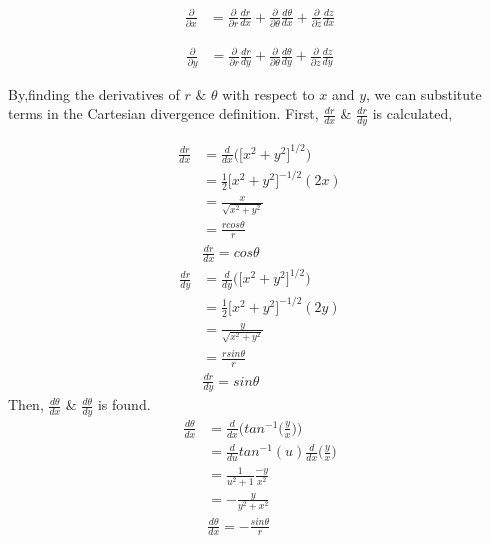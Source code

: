 \documentclass[12pt]{article}
\begin{document}
\begin{align*}
	\frac{\partial }{\partial x}
	&= \frac{\partial }{\partial r}\frac{d r}{d x} +
	\frac{\partial }{\partial \theta}\frac{d \theta}{d x} +
	\frac{\partial }{\partial z}\frac{d z}{d x} 
\end{align*}

\begin{align*}
	\frac{\partial }{\partial y}
	&=
	\frac{\partial }{\partial r} 	 \frac{d r}{d y} +
	\frac{\partial }{\partial \theta} \frac{d \theta}{d y} + \frac{\partial }{\partial z}     \frac{d z}{d y}
\end{align*}


By,finding the derivatives of $r$ $\&$ $\theta$ with respect to $x$ and $y$, we can substitute terms in the Cartesian divergence definition. First, $\frac{dr}{dx}$ \& $\frac{dr}{dy}$ is calculated,

\begin{align*}
 	\frac{dr}{dx}                                      
	&= \frac{d}{dx} \Bigg(\Big[ x^2 + y^2 \Big]^{1/2}\Bigg) \\
	&= \frac{1}{2} \Big[ x^2 + y^2 \Big]^{-1/2} (2x) \\
 	&=	\frac{x}{\sqrt{x^2+y^2}}\\
 	&= \frac{r cos\theta}{r}\\
 	& \boxed{\frac{dr}{dx} = cos\theta} 
\end{align*}
\begin{align*}
	\frac{dr}{d y}
	&= \frac{d}{dy} \Bigg(\Big[ x^2 + y^2 \Big]^{1/2}\Bigg) \\
	&= \frac{1}{2}\Big[x^2 + y^2\Big]^{-1/2}(2y) \\
	&= \frac{y}{\sqrt{x^2+y^2}} \\
	&= \frac{r sin\theta}{r}\\
	& \boxed{\frac{dr}{d y} = sin\theta} 
\end{align*}
Then, $\frac{d\theta}{dx}$ \& $\frac{d\theta}{dy}$ is found.
\begin{align*}
	\frac{d \theta}{d x} 
	&= \frac{d}{dx} \Bigg(tan^{-1} \Big(\frac{y}{x}\Big)\Bigg)  \\
	&= \frac{d}{du}tan^{-1}(u) \frac{d}{dx} \Big( \frac{y}{x} \Big)\\
	&= \frac{1}{u^2  + 1} \frac{-y}{x^2} \\
	&= -\frac{y}{y^2 + x^2} \\
	& \boxed{ \frac{d \theta}{d x} =-\frac{sin \theta}{r}}
\end{align*}
\end{document}
